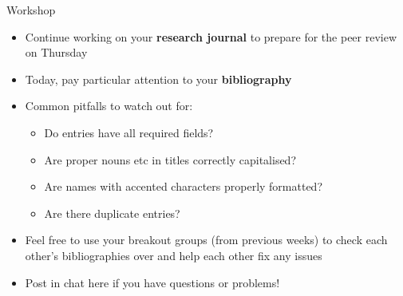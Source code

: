 \begin{frame}{Workshop}
    \begin{itemize}
        \item Continue working on your \textbf{research journal} to prepare for the peer review on Thursday
        \item Today, pay particular attention to your \textbf{bibliography}
        \item Common pitfalls to watch out for:
        \begin{itemize}
            \item Do entries have all required fields?
            \item Are proper nouns etc in titles correctly capitalised?
            \item Are names with accented characters properly formatted?
            \item Are there duplicate entries?
        \end{itemize}
        \item Feel free to use your breakout groups (from previous weeks) to check each other's bibliographies over and help each other fix any issues
        \item Post in chat here if you have questions or problems!
    \end{itemize}
\end{frame}



